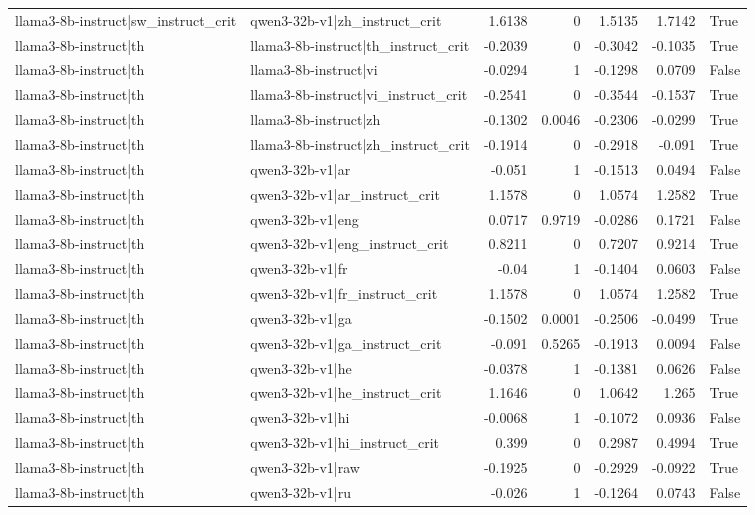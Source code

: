 \begin{table}
\begin{tabular}{l l r r r r l}
llama3-8b-instruct|sw_instruct_crit & qwen3-32b-v1|zh_instruct_crit & 1.6138 & 0 & 1.5135 & 1.7142 & True \\
llama3-8b-instruct|th & llama3-8b-instruct|th_instruct_crit & -0.2039 & 0 & -0.3042 & -0.1035 & True \\
llama3-8b-instruct|th & llama3-8b-instruct|vi & -0.0294 & 1 & -0.1298 & 0.0709 & False \\
llama3-8b-instruct|th & llama3-8b-instruct|vi_instruct_crit & -0.2541 & 0 & -0.3544 & -0.1537 & True \\
llama3-8b-instruct|th & llama3-8b-instruct|zh & -0.1302 & 0.0046 & -0.2306 & -0.0299 & True \\
llama3-8b-instruct|th & llama3-8b-instruct|zh_instruct_crit & -0.1914 & 0 & -0.2918 & -0.091 & True \\
llama3-8b-instruct|th & qwen3-32b-v1|ar & -0.051 & 1 & -0.1513 & 0.0494 & False \\
llama3-8b-instruct|th & qwen3-32b-v1|ar_instruct_crit & 1.1578 & 0 & 1.0574 & 1.2582 & True \\
llama3-8b-instruct|th & qwen3-32b-v1|eng & 0.0717 & 0.9719 & -0.0286 & 0.1721 & False \\
llama3-8b-instruct|th & qwen3-32b-v1|eng_instruct_crit & 0.8211 & 0 & 0.7207 & 0.9214 & True \\
llama3-8b-instruct|th & qwen3-32b-v1|fr & -0.04 & 1 & -0.1404 & 0.0603 & False \\
llama3-8b-instruct|th & qwen3-32b-v1|fr_instruct_crit & 1.1578 & 0 & 1.0574 & 1.2582 & True \\
llama3-8b-instruct|th & qwen3-32b-v1|ga & -0.1502 & 0.0001 & -0.2506 & -0.0499 & True \\
llama3-8b-instruct|th & qwen3-32b-v1|ga_instruct_crit & -0.091 & 0.5265 & -0.1913 & 0.0094 & False \\
llama3-8b-instruct|th & qwen3-32b-v1|he & -0.0378 & 1 & -0.1381 & 0.0626 & False \\
llama3-8b-instruct|th & qwen3-32b-v1|he_instruct_crit & 1.1646 & 0 & 1.0642 & 1.265 & True \\
llama3-8b-instruct|th & qwen3-32b-v1|hi & -0.0068 & 1 & -0.1072 & 0.0936 & False \\
llama3-8b-instruct|th & qwen3-32b-v1|hi_instruct_crit & 0.399 & 0 & 0.2987 & 0.4994 & True \\
llama3-8b-instruct|th & qwen3-32b-v1|raw & -0.1925 & 0 & -0.2929 & -0.0922 & True \\
llama3-8b-instruct|th & qwen3-32b-v1|ru & -0.026 & 1 & -0.1264 & 0.0743 & False \\

\end{tabular}
\end{table}
